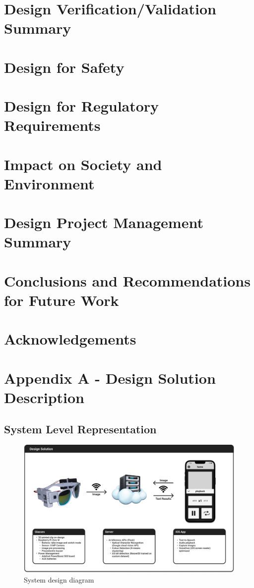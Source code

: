 \documentclass[a4paper,11pt]{article}
\begin{document}
\newpage
\section{Design Verification/Validation Summary}


\section{Design for Safety}

\section{Design for Regulatory Requirements}

\section{Impact on Society and Environment}

\section{Design Project Management Summary}

\section{Conclusions and Recommendations for Future Work}

\section{Acknowledgements}

\newpage
\section{Appendix A - Design Solution Description}
\subsection{System Level Representation}

\begin{figure}[H]
\centering
\includegraphics[scale=0.265]{img/system_diagram.png}
\caption{System design diagram}
\label{fig:system_diagram}
\end{figure}
\end{document}
